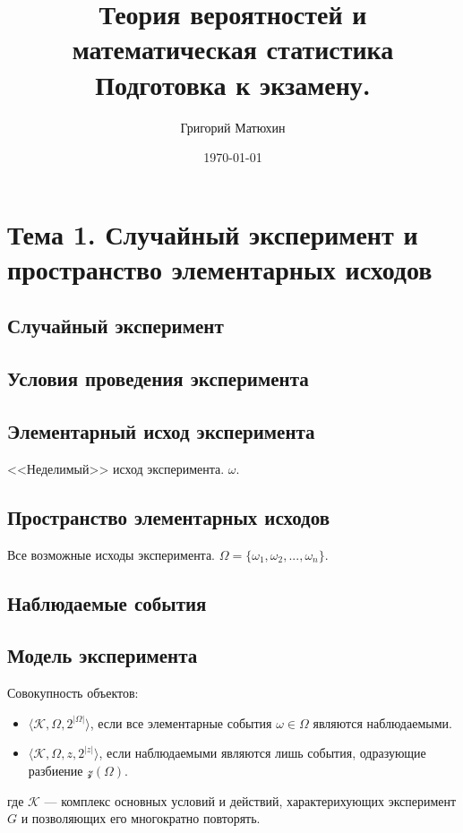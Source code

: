 \documentclass[12pt]{article}
\author{Григорий Матюхин}
\date{\today}
\title{
	Теория вероятностей и математическая статистика \\
	\large Подготовка к экзамену.
}
\begin{document}
\maketitle
\newpage
\tableofcontents
\newpage

\section{Тема 1. Случайный эксперимент и пространство элементарных исходов}

\subsection{Случайный эксперимент}

\subsection{Условия проведения эксперимента}

\subsection{Элементарный исход эксперимента}
<<Неделимый>> исход эксперимента. $\omega$.

\subsection{Пространство элементарных исходов}
Все возможные исходы эксперимента. $\Omega = \{\omega_1, \omega_2, ..., \omega_n\}$.

\subsection{Наблюдаемые события}

\subsection{Модель эксперимента}
Совокупность объектов:
\begin{itemize}
	\item $\langle \mathcal{K}, \Omega, 2^{|\Omega|}\rangle$,
	      если все элементарные события $\omega \in \Omega$ являются наблюдаемыми.
	\item $\langle \mathcal{K}, \Omega, \mathit{z}, 2^{|\mathit{z}|}\rangle$,
	      если наблюдаемыми являются лишь события, одразующие разбиение $\mathcal{z}(\Omega)$.
\end{itemize}
где $\mathcal{K}$ --- комплекс основных условий и действий, характерихующих эксперимент $G$ и позволяющих его многократно повторять.
\end{document}
